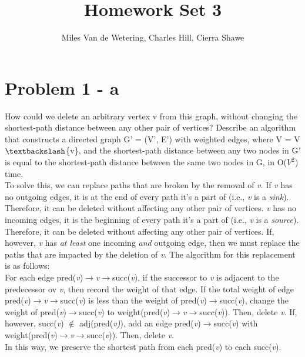 \documentclass[]{article}
\title{Homework Set 3}
\author{Miles Van de Wetering, Charles Hill, Cierra Shawe}
\begin{document}
\maketitle

\section*{Problem 1 - a}
How could we delete an arbitrary vertex v from this graph, without changing the shortest-path distance
between any other pair of vertices? Describe an algorithm that constructs a directed graph G' = (V', E') with weighted edges, where V = V $\textbackslash$\{v\}, and the shortest-path distance between any two nodes in G' is equal to the shortest-path distance between the same two nodes in G, in O($V^2$) time.\\

To solve this, we can replace paths that are broken by the removal of \textit{v}. If \textit{v} has no outgoing edges, it is at the end of every path it's a part of (i.e., \textit{v} is a \textit{sink}). Therefore, it can be deleted without affecting any other pair of vertices. \textit{v} has no incoming edges, it is the beginning of every path it's a part of (i.e., \textit{v} is a \textit{source}). Therefore, it can be deleted without affecting any other pair of vertices. If, however, \textit{v} has \textit{at least} one incoming \textit{and} outgoing edge, then we must replace the paths that are impacted by the deletion of \textit{v}. The algorithm for this replacement is as follows: \\

For each edge pred(\textit{v})$\rightarrow$\textit{v}$\rightarrow$succ(\textit{v}), if the successor to \textit{v} is adjacent to the predecessor ov \textit{v}, then record the weight of that edge. If the total weight of edge pred(\textit{v})$\rightarrow$\textit{v}$\rightarrow$succ(\textit{v}) is less than the weight of pred(\textit{v})$\rightarrow$succ(\textit{v}), change the weight of  pred(\textit{v})$\rightarrow$succ(\textit{v}) to weight(pred(\textit{v})$\rightarrow$\textit{v}$\rightarrow$succ(\textit{v})). Then, delete \textit{v}. If, however, succ(\textit{v}) $\notin$ adj(pred(\textit{v)}), add an edge pred(\textit{v})$\rightarrow$succ(\textit{v}) with weight(pred(\textit{v})$\rightarrow$\textit{v}$\rightarrow$succ(\textit{v})). Then, delete \textit{v}. \\

In this way, we preserve the shortest path from each pred(\textit{v}) to each succ(\textit{v}).\\ 
\end{document}
